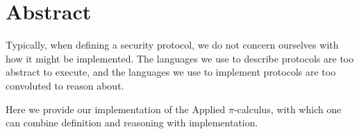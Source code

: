 \section*{Abstract}

Typically, when defining a security protocol, we do not concern ourselves with how it might be implemented. The languages we use to describe protocols are too abstract to execute, and the languages we use to implement protocols are too convoluted to reason about.

Here we provide our implementation of the Applied $\pi$-calculus, with which one can combine definition and reasoning with implementation. 
